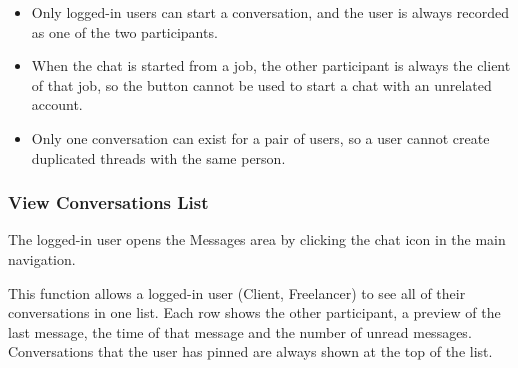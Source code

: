 \begin{itemize}[leftmargin=1.6em,topsep=4pt,itemsep=3pt,parsep=0pt,label=$\bullet$]
\begin{itemize}[leftmargin=2.2em,topsep=2pt,itemsep=3pt,parsep=0pt,label=$\circ$]
            \item Only logged-in users can start a conversation, and the user is always recorded as one of the two participants.
            \item When the chat is started from a job, the other participant is always the client of that job, so the button cannot be used to start a chat with an unrelated account.
            \item Only one conversation can exist for a pair of users, so a user cannot create duplicated threads with the same person.
        \end{itemize}
\end{itemize}


\subsubsection{View Conversations List}

 The logged-in user opens the Messages area by clicking the chat icon in the main navigation.

 This function allows a logged-in user (Client, Freelancer) to see all of their conversations in one list. Each row shows the other participant, a preview of the last message, the time of that message and the number of unread messages. Conversations that the user has pinned are always shown at the top of the list.



